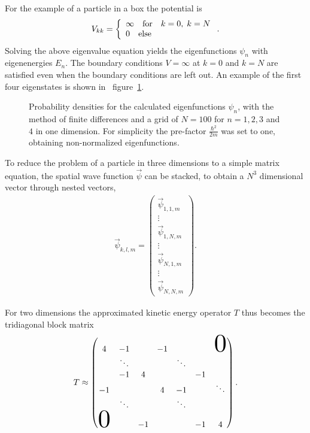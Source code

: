 \documentclass[twoside,        %
			   11pt,			%
               BCOR10mm,       %
               ngerman,english  %
               ]{scrartcl}
\begin{document}
\par For the example of a particle in a box the potential is
\begin{align} 
V_{kk} = \left\{ \begin{array}{ll}  \infty  \quad \text{for} \quad  k = 0, \; k= N \\  0 \quad \text{else} \end{array} \right. \text.
\end{align}
Solving the above eigenvalue equation yields the eigenfunctions $\psi_n$ with eigenenergies $E_n$. The boundary conditions $V = \infty$ at $k=0$ and $k=N$ are satisfied even when the boundary conditions are left out. An example of the first four eigenstates is shown in \mbox{ figure \ref{fig:eigenfunctions}.}
\begin{figure}[!htb]
	\Huge
	\centering
	\resizebox{!}{0.4\textwidth}{}
	\caption{Probability densities for the calculated eigenfunctions $\psi_n$, with the method of finite differences and a grid of $N=100$ for $n = 1,2,3$ and $4$ in one dimension. For simplicity the pre-factor $\frac{\hbar^2}{2m}$ was set to one, obtaining non-normalized eigenfunctions.}
	\label{fig:eigenfunctions}
\end{figure} 
To reduce the problem of a particle in three dimensions to a simple matrix equation, the spatial wave function $\vec{\psi}$ can be stacked, to obtain a $N^3$ dimensional vector through nested vectors,
\begin{align}
\vec{\psi}_{k,l,m} = \begin{pmatrix}\vec{\psi}_{1,1,m} \\ \vdots \\ \vec{\psi}_{1,N,m} \\ \vdots \\ \vec{\psi}_{N,1,m} \\ \vdots \\ \vec{\psi}_{N,N,m} \end{pmatrix}.
\end{align}

For two dimensions the approximated kinetic energy operator $T$ thus becomes the tridiagonal block matrix
\begin{align}
T \approx  \begin{pmatrix}
4	& -1	&  &  -1	 &     &     &  \scalebox{3}{$0$}  \\
    & \ddots	&     & 		&   \ddots   & 	& \\
    & -1 & 4 &  &  &-1 \\
-1 &      &          & 4     & -1       & & \ddots \\
    & \ddots &     &&    \ddots   &       &  \\
  \scalebox{3}{$0$}   &      & -1       &&         & -1     & 4 \\ 
\end{pmatrix} \text{.}
\end{align}
\end{document}

